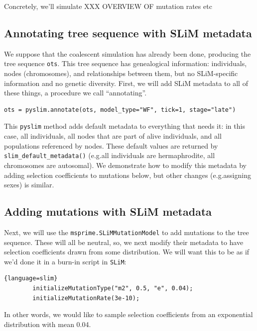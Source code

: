 \documentclass[12pt]{article}
\newcommand{\slim}[0]{\texttt{SLiM}\xspace}
\newcommand{\pyslim}[0]{\texttt{pyslim}\xspace}
\newcommand*{\eg}{e.g.\xcomma}
\begin{document}
Concretely, we'll simulate XXX OVERVIEW OF mutation rates etc


\subsection*{Annotating tree sequence with SLiM metadata}

We suppose that the coalescent simulation has already been done,
producing the tree sequence \verb|ots|.
This tree sequence has genealogical information:
individuals, nodes (chromosomes), and relationships between them,
but no SLiM-specific information and no genetic diversity.
First, we will add SLiM metadata to all of these things, a procedure we call ``annotating''.
\begin{listing}[H]
  \begin{verbatim}
ots = pyslim.annotate(ots, model_type="WF", tick=1, stage="late")
  \end{verbatim}
\end{listing}
This \pyslim method adds default metadata to everything that needs it:
in this case, all individuals, all nodes that are part of alive individuals,
and all populations referenced by nodes.
These default values are returned by \verb|slim_default_metadata()|
(\eg all individuals are hermaphrodite, all chromosomes are autosomal).
We demonstrate how to modify this metadata by adding selection coefficients to mutations below,
but other changes (\eg assigning sexes) is similar.

\subsection*{Adding mutations with SLiM metadata}

Next, we will use the \verb|msprime.SLiMMutationModel| to add mutations to the tree sequence.
These will all be neutral,
so, we next modify their metadata to have selection coefficients drawn from some distribution.
We will want this to be as if we'd done it in a burn-in script in \slim :
\begin{lstlisting}{language=slim}
        initializeMutationType("m2", 0.5, "e", 0.04);
        initializeMutationRate(3e-10);
\end{lstlisting}
In other words, we would like to sample selection coefficients
from an exponential distribution with mean 0.04.
\end{document}
